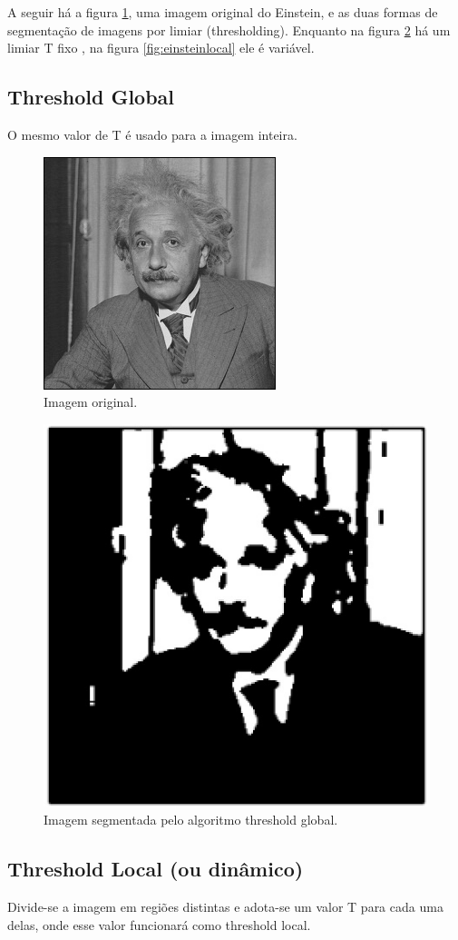 A seguir há a figura \ref{fig:einstein}, uma imagem original do Einstein,  e as duas formas de segmentação de imagens por limiar (thresholding). Enquanto na figura \ref{fig:einsteinglobal} há um limiar T fixo , na  figura \ref{fig:einsteinlocal} ele é variável.

\subsection*{Threshold Global}
O mesmo valor de T é usado para a imagem inteira.

  \begin{figure}[!htb]
       \begin{center}  
          \includegraphics[width=0.3\columnwidth]{img/einstein.jpg}
           \caption{\label{fig:einstein}Imagem original\citep{stanford}.}
       \end{center}
   \end{figure}

  \begin{figure}[!htb]
       \begin{center}  
          \includegraphics[width=0.3\columnwidth]{img/einstein-globalthresholding127.jpg}
           \caption{\label{fig:einsteinglobal}Imagem segmentada pelo algoritmo threshold global.}
       \end{center}
   \end{figure}

\subsection*{Threshold Local (ou dinâmico)}
Divide-se a imagem em regiões distintas e adota-se um valor T para cada uma delas, onde esse valor funcionará como threshold local. 

